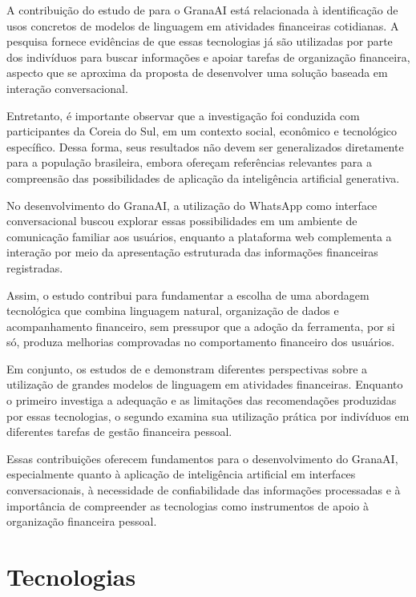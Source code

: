 A contribuição do estudo de  para o GranaAI está relacionada à identificação de usos concretos de modelos de linguagem em atividades financeiras cotidianas. A pesquisa fornece evidências de que essas tecnologias já são utilizadas por parte dos indivíduos para buscar informações e apoiar tarefas de organização financeira, aspecto que se aproxima da proposta de desenvolver uma solução baseada em interação conversacional.

Entretanto, é importante observar que a investigação foi conduzida com participantes da Coreia do Sul, em um contexto social, econômico e tecnológico específico. Dessa forma, seus resultados não devem ser generalizados diretamente para a população brasileira, embora ofereçam referências relevantes para a compreensão das possibilidades de aplicação da inteligência artificial generativa.

No desenvolvimento do GranaAI, a utilização do WhatsApp como interface conversacional buscou explorar essas possibilidades em um ambiente de comunicação familiar aos usuários, enquanto a plataforma web complementa a interação por meio da apresentação estruturada das informações financeiras registradas.

Assim, o estudo contribui para fundamentar a escolha de uma abordagem tecnológica que combina linguagem natural, organização de dados e acompanhamento financeiro, sem pressupor que a adoção da ferramenta, por si só, produza melhorias comprovadas no comportamento financeiro dos usuários.

Em conjunto, os estudos de  e  demonstram diferentes perspectivas sobre a utilização de grandes modelos de linguagem em atividades financeiras. Enquanto o primeiro investiga a adequação e as limitações das recomendações produzidas por essas tecnologias, o segundo examina sua utilização prática por indivíduos em diferentes tarefas de gestão financeira pessoal.

Essas contribuições oferecem fundamentos para o desenvolvimento do GranaAI, especialmente quanto à aplicação de inteligência artificial em interfaces conversacionais, à necessidade de confiabilidade das informações processadas e à importância de compreender as tecnologias como instrumentos de apoio à organização financeira pessoal.

\section{Tecnologias}


